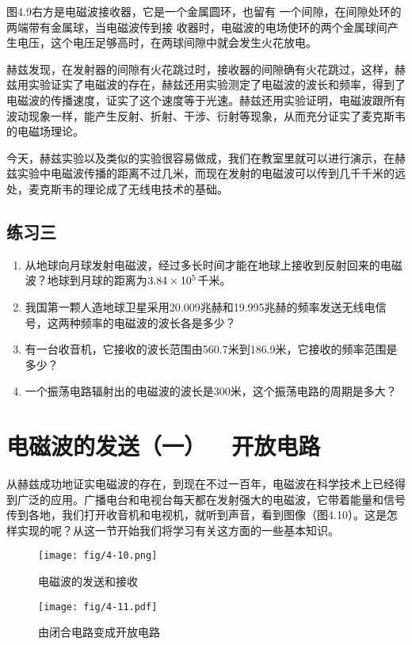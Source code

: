 图4.9右方是电磁波接收器，它是一个金属圆环，也留有
一个间隙，在间隙处环的两端带有金属球，当电磁波传到接
收器时，电磁波的电场使环的两个金属球间产生电压，这个电压足够高时，在两球间隙中就会发生火花放电。

赫兹发现，在发射器的间隙有火花跳过时，接收器的间隙确有火花跳过，这样，赫兹用实验证实了电磁波的存在，赫兹还用实验测定了电磁波的波长和频率，得到了电磁波的传播速度，证实了这个速度等于光速。赫兹还用实验证明，电磁波跟所有波动现象一样，能产生反射、折射、干涉、衍射等现象，从而充分证实了麦克斯韦的电磁场理论。

今天，赫兹实验以及类似的实验很容易做成，我们在教室里就可以进行演示，在赫兹实验中电磁波传播的距离不过几米，而现在发射的电磁波可以传到几千千米的远处，麦克斯韦的理论成了无线电技术的基础。

\subsection*{练习三}
\begin{enumerate}
	\item 从地球向月球发射电磁波，经过多长时间才能在地球上接收到反射回来的电磁波？地球到月球的距离为$3.84\times10^5$千米。
	\item 我国第一颗人造地球卫星采用20.009兆赫和19.995兆赫的频率发送无线电信号，这两种频率的电磁波的波长各是多少？
	\item 有一台收音机，它接收的波长范围由560.7米到186.9米，它接收的频率范围是多少？
	\item 一个振荡电路辐射出的电磁波的波长是300米，这个振荡电路的周期是多大？
\end{enumerate}

\section{电磁波的发送（一）~~开放电路}
从赫兹成功地证实电磁波的存在，到现在不过一百年，电磁波在科学技术上已经得到广泛的应用。广播电台和电视台每天都在发射强大的电磁波，它带着能量和信号传到各地，我们打开收音机和电视机，就听到声音，看到图像（图4.10）。这是怎样实现的呢？从这一节开始我们将学习有关这方面的一些基本知识。
\begin{figure}[htp]\centering
\texttt{[image: fig/4-10.png]}
\caption{电磁波的发送和接收}
\end{figure}

\begin{figure}[htp]\centering
	\texttt{[image: fig/4-11.pdf]}
	\caption{由闭合电路变成开放电路}
	\end{figure}

